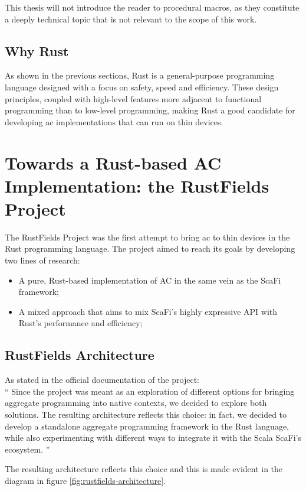 

This thesis will not introduce the reader to procedural macros, as they constitute a deeply technical topic that is not relevant to the scope of this work.

\subsection{Why Rust}
As shown in the previous sections, Rust is a general-purpose programming language designed with a focus on safety, speed and efficiency. These design principles, coupled with high-level features
more adjacent to functional programming than to low-level programming, making Rust a good candidate for developing \ac{ac} implementations that can run on thin devices.


\section{Towards a Rust-based AC Implementation: the RustFields Project}
The RustFields Project\cite{001} was the first attempt to bring \ac{ac} to thin devices in the Rust programming language. The project aimed to reach its goals by developing two lines of research:
\begin{itemize}
    \item A pure, Rust-based implementation of AC in the same vein as the ScaFi framework;
    \item A mixed approach that aims to mix ScaFi's highly expressive API with Rust's performance and efficiency;
\end{itemize}

\subsection{RustFields Architecture}
As stated in the official documentation of the project: \\
``    Since the project was meant as an exploration of different options for bringing aggregate programming into native contexts, we decided to explore both solutions. The resulting architecture reflects this choice: in fact, we decided to develop a standalone aggregate programming framework in the Rust language, while also experimenting with different ways to integrate it with the Scala ScaFi’s ecosystem.
''

The resulting architecture reflects this choice and this is made evident in the diagram in figure \ref{fig:rustfields-architecture}.

